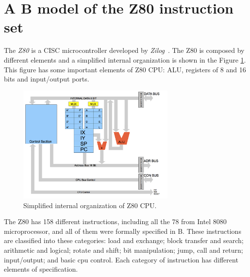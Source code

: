 \documentclass[a4paper]{llncs}
\begin{document}
%
%


\section{A B model of the Z80 instruction set}
\label{sec:z80}

The \textit{Z80} is a CISC microcontroller developed by
\textit{Zilog}~\cite{Z80_manual}. The Z80 is composed by different elements and a
simplified internal organization is shown in the Figure \ref{fig:DiagramBlock}.
This figure has some important elements of Z80 CPU: ALU, registers of 8 and 16
bits and input/output ports.

\begin{figure}[h] \centering
\includegraphics[width=0.70\textwidth]{images/Architecture.png}
\caption{Simplified internal organization of Z80 CPU.}
\label{fig:DiagramBlock}
\end{figure}


The Z80 has 158 different instructions, including all the 78 from Intel 8080
microprocessor, and all of them were formally specified in B. These instructions are classified
into these categories: load and exchange; block transfer and search; arithmetic
and logical; rotate and shift; bit manipulation; jump, call and return;
input/output; and basic cpu control. Each category of instruction has different
elements of specification.
\end{document}
